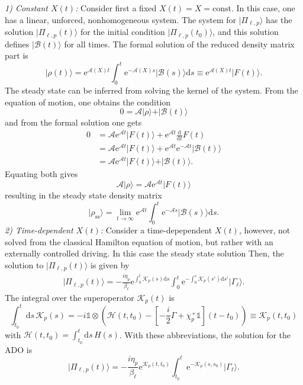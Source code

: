 \documentclass{article}
\newcommand{\exP}[1]{\mathrm{e}^{#1}}
\newcommand{\dif}{\mathrm{d}}
\begin{document}
\textit{1) Constant $X(t)$:} Consider first a fixed $X(t)=X=\mathrm{const}$. In this case, one has a linear, unforced, nonhomogeneous system. The system for $\vert \Pi_{\ell,p}\rangle$ has the solution $\vert \Pi_{\ell,p}(t)\rangle$ for the initial condition $\vert \Pi_{\ell,p}(t_0)\rangle$, and this solution defines $\vert \mathcal{B}(t)\rangle$ for all times. The formal solution of the reduced density matrix part is
\begin{equation*}
\vert \rho(t)\rangle = \exP{\mathcal{A}(X)t} \int_0^t \exP{-\mathcal{A}(X)s}\vert \mathcal{B}(s)\rangle \dif s \equiv \exP{\mathcal{A}(X)t} \vert F(t)\rangle.
\end{equation*}
The steady state can be inferred from solving the kernel of the system. From the equation of motion, one obtains the condition
\begin{equation*}
	0 = \mathcal{A}\vert \rho\rangle + \vert \mathcal{B}(t)\rangle 
\end{equation*}
and from the formal solution one gets
\begin{align*}
	0 &=  \mathcal{A}\exP{\mathcal{A}t} \vert F(t)\rangle + \exP{\mathcal{A}t} \frac{\dif }{\dif t}F(t)\\
	&= \mathcal{A}\exP{\mathcal{A}t} \vert F(t)\rangle + \exP{\mathcal{A}t}\exP{-\mathcal{A}t}\vert \mathcal{B}(t)\rangle\\
	&= \mathcal{A}\exP{\mathcal{A}t} \vert F(t)\rangle +\vert \mathcal{B}(t)\rangle.
\end{align*}
Equating both gives 
\begin{equation*}
	\mathcal{A}\vert \rho\rangle = \mathcal{A}\exP{\mathcal{A}t} \vert F(t)\rangle
\end{equation*}
resulting in the steady state density matrix
\begin{equation*}
	\vert \rho_\mathrm{ss} \rangle = \lim_{t\rightarrow \infty} \exP{\mathcal{A}t}\int_0^t \exP{-\mathcal{A}s}\vert \mathcal{B}(s)\rangle \dif s.
\end{equation*}
\textit{2) Time-dependent $X(t)$:} Consider a time-depependent $X(t)$, however, not solved from the classical Hamilton equation of motion, but rather with an externally controlled driving. In this case the steady state solution 
Then,  the solution to $\vert \Pi_{\ell,p}(t)\rangle$ is given by 
\begin{align*}
	\vert \Pi_{\ell,p}(t)\rangle = -\frac{i\eta_p}{\beta_\ell}\exP{\int_0^t \mathcal{K}_p(s)\dif s}\int_0^t  \exP{-\int_0^s \mathcal{K}_p(s')\dif s'} \vert \Gamma_\ell\rangle.
\end{align*}
The integral over the superoperator $\mathcal{K}_p(t)$ is
\begin{equation*}
	\int_{t_0}^t \dif s\, \mathcal{K}_p(s) = -i\mathds{1}\otimes\left( \mathscr{H}(t,t_0) - \left[-\frac{i}{2}\Gamma + \chi_p^+\mathds{1}\right](t-t_0)\right) \equiv \mathscr{K}_p(t,t_0)
\end{equation*}
with $\mathscr{H}(t,t_0)=\int_{t_0}^t \dif s\, H(s)$. With these abbreviations, the solution for the ADO is
\begin{equation*}
	\vert \Pi_{\ell,p}(t)\rangle = -\frac{i\eta_p}{\beta_\ell}\exP{\mathscr{K}_p(t,t_0)}\int_{t_0}^t  \exP{-\mathscr{K}_p(s,s_0)} \vert \Gamma_\ell\rangle.
\end{equation*} 
\printbibliography
\end{document}
